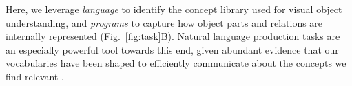

Here, we leverage \textit{language} to identify the concept library used for visual object understanding, and \textit{programs} to capture how object parts and relations are internally represented (Fig.~\ref{fig:task}B).
Natural language production tasks are an especially powerful tool towards this end, given abundant evidence that our vocabularies have been shaped to efficiently communicate about the concepts we find relevant .

